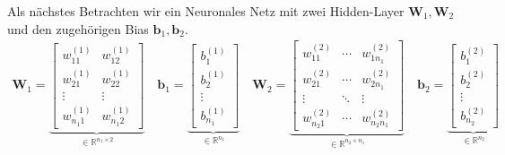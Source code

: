 \documentclass[a4paper, 12pt]{scrartcl}
\begin{document}
Als nächstes Betrachten wir ein Neuronales Netz mit zwei Hidden-Layer $\bm{W}_1, \bm{W}_2$ 
und den zugehörigen Bias $\bm{b}_1, \bm{b}_2$. 
\begin{align*}
    \bm{W}_1 
    =
    \underbrace{
        \begin{bmatrix}
            w_{11}^{(1)} & w_{12}^{(1)} \\
            w_{21}^{(1)} & w_{22}^{(1)}  \\
            \vdots & \vdots \\
            w_{n_1 1}^{(1)} & w_{n_1 2}^{(1)}
        \end{bmatrix}
    }_{
        \in \mathbb{R}^{n_1 \times 2}
    }
    \quad
    \bm{b}_1
    =
    \underbrace{
        \begin{bmatrix}
            b_1^{(1)} \\
            b_2^{(1)} \\
            \vdots \\
            b_{n_1}^{(1)}
        \end{bmatrix}
    }_{
        \in \mathbb{R}^{n_1}
    }
    \quad
    \bm{W}_2
    =
    \underbrace{
        \begin{bmatrix}
            w_{11}^{(2)} & \cdots   & w_{1 n_1}^{(2)} \\
            w_{21}^{(2)} & \cdots   & w_{2 n_1}^{(2)}  \\
            \vdots & \ddots &  \vdots\\
            w_{n_2 1}^{(2)} & \cdots  & w_{n_2 n_1}^{(2)}
        \end{bmatrix}
    }_{
        \in \mathbb{R}^{n_2 \times n_1} 
    }
    \quad
    \bm{b}_2
    =
    \underbrace{
        \begin{bmatrix}
            b_1^{(2)} \\
            b_2^{(2)} \\
            \vdots \\
            b_{n_2}^{(2)}
        \end{bmatrix}
    }_{
        \in \mathbb{R}^{n_2}
    }
\end{align*}
\end{document}
